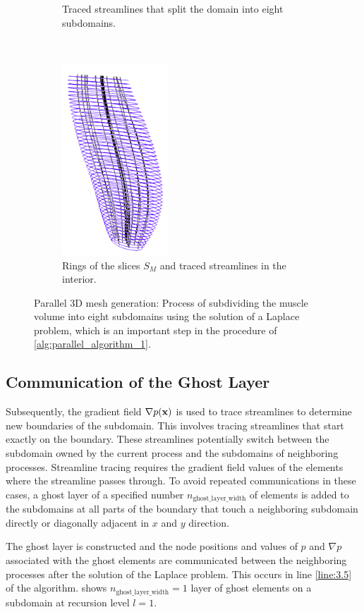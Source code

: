 \begin{figure}
\begin{subfigure}[t]{0.19\textwidth}
    \caption{Traced streamlines that split the domain into eight subdomains.}%
    \label{fig:boundary_points_1}%
  \end{subfigure}
  \,
  \begin{subfigure}[t]{0.24\textwidth}%
    \centering%
    \includegraphics[height=7.2cm]{images/parallel_fiber_estimation/slices_2.png}
    \caption{Rings of the slices $S_M$ and traced streamlines in the interior.}%
    \label{fig:slices_2}%
  \end{subfigure}
  \caption{Parallel 3D mesh generation: Process of subdividing the muscle volume into eight subdomains using the solution of a Laplace problem, which is an important step in the procedure of \cref{alg:parallel_algorithm_1}.}
  \label{fig:determining_subdomains}%
\end{figure}

\subsection{Communication of the Ghost Layer}

Subsequently, the gradient field $\nabla p(\textbf{x})$ is used to trace streamlines to determine new boundaries of the subdomain. This involves tracing streamlines that start exactly on the boundary. These streamlines potentially switch between the subdomain owned by the current process and the subdomains of neighboring processes. Streamline tracing requires the gradient field values of the elements where the streamline passes through.
To avoid repeated communications in these cases, a ghost layer of a specified number $n_\text{ghost\_layer\_width}$ of elements is added to the subdomains at all parts of the boundary that touch a neighboring subdomain directly or diagonally adjacent in $x$ and $y$ direction.

The ghost layer is constructed and the node positions and values of $p$ and $\nabla p$ associated with the ghost elements are communicated between the neighboring processes after the solution of the Laplace problem.
This occurs in line \ref{line:3.5} of the algorithm.  shows $n_\text{ghost\_layer\_width}=1$ layer of ghost elements on a subdomain at recursion level $l=1$.

